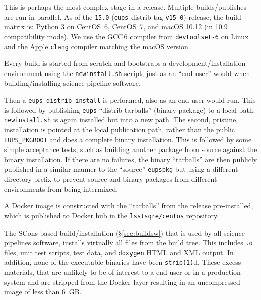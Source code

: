 This is perhaps the most complex stage in a release.  Multiple builds/publishes
are run in parallel.  As of the \texttt{15.0} (\texttt{eups} distrib tag
\texttt{v15\_0}) release, the build matrix is: Python 3 on CentOS~6, CentOS~7, and macOS 10.12 (in 10.9 compatibility mode).
We use the GCC\,6 compiler from \texttt{devtoolset-6} on Linux and the Apple \texttt{clang} compiler matching the macOS version.

\noindent Every build is started from scratch and bootstraps a development/installation environment using the \href{https://github.com/lsst/lsst/blob/master/scripts/newinstall.sh}{\texttt{new\-install.sh}}\cite{pipelines-guide} script, just as an ``end user'' would when building/installing science pipeline software.

\noindent Then a \texttt{eups distrib install} is performed, also as an end-user would
run.  This is followed by publishing \texttt{eups} ``distrib tarballs'' (binary
package) to a local path.  \texttt{newinstall.sh} is again installed but into a
new path.  The second, pristine, installation is pointed at the local publication
path, rather than the public \texttt{EUPS\_PKGROOT} and does a complete binary
installation.  This is followed by some simple acceptance tests, such as
building another package from source against the binary installation.  If there
are no failures, the binary ``tarballs'' are then publicly published in a
similar manner to the ``source'' \texttt{eupspkg} but using a different
directory prefix to prevent source and binary packages from different
environments from being intermixed.

A \href{https://github.com/lsst-sqre/docker-tarballs}{Docker image} is
constructed with the ``tarballs'' from the release pre-installed, which is
published to Docker hub in the
\href{https://hub.docker.com/r/lsstsqre/centos/}{\texttt{lsstsqre/centos}} repository.

\noindent The SCons-based build/installation (\S\ref{sec:buildsw}) that is used by all science pipelines software, installs
virtually all files from the build tree. This includes \texttt{.o} files, unit
test scripts, test data, and \texttt{doxygen} HTML and XML output. In
addition, none of the executable binaries have been \texttt{strip(1)}d.  These
excess materials, that are unlikely to be of interest to a end user or in a
production system
and are stripped from the Docker layer resulting in an uncompressed image of less than 6~GB.

